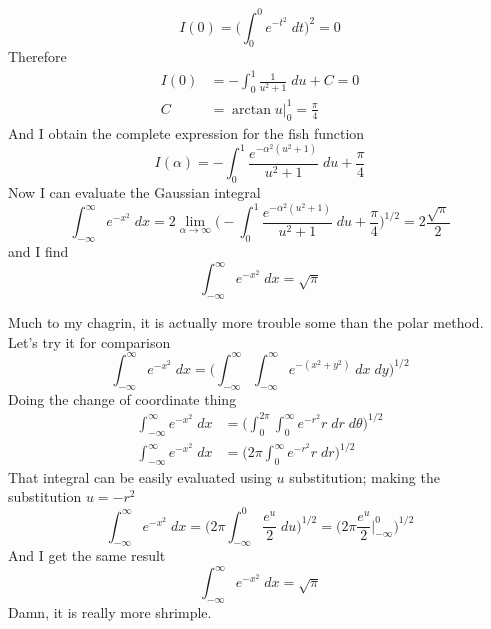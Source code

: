 \documentclass[../../main.tex]{subfiles}
\begin{document}
\begin{equation*}
    I(0)=\biggl(\int_{0}^{0}e^{-t^2}\;dt\biggr)^2=0
\end{equation*}
Therefore
\begin{align*}
    I(0)&=-\int_{0}^{1}\frac{1}{u^2+1}\;du+C=0\\
    C&=\arctan u\bigg|_{0}^{1}=\frac{\pi}{4}
\end{align*}
And I obtain the complete expression for the fish function
\begin{equation*}
    I(\alpha)=-\int_{0}^{1}\frac{e^{-\alpha^2(u^2+1)}}{u^2+1}\;du+\frac{\pi}{4}
\end{equation*}
Now I can evaluate the Gaussian integral
\begin{equation*}
    \int_{-\infty}^{\infty}e^{-x^2}\;dx=2\lim_{\alpha\rightarrow\infty}\biggl(-\int_{0}^{1}\frac{e^{-\alpha^2(u^2+1)}}{u^2+1}\;du+\frac{\pi}{4}\biggr)^{1/2}=2\frac{\sqrt{\pi}}{2}
\end{equation*}
and I find 
\begin{equation*}
    \int_{-\infty}^{\infty}e^{-x^2}\;dx=\sqrt{\pi}
\end{equation*}

Much to my chagrin, it is actually more trouble some than the polar method. Let's try it for comparison
\begin{equation*}
    \int_{-\infty}^{\infty}e^{-x^2}\;dx=\biggl(\int_{-\infty}^{\infty}\int_{-\infty}^{\infty}e^{-(x^2+y^2)}\;dx\;dy\biggr)^{1/2}
\end{equation*}
Doing the change of coordinate thing
\begin{align*}
    \int_{-\infty}^{\infty}e^{-x^2}\;dx&=\biggl(\int_{0}^{2\pi}\int_{0}^{\infty}e^{-r^2}r\;dr\;d\theta \biggr)^{1/2}\\
    \int_{-\infty}^{\infty}e^{-x^2}\;dx& = \biggl(2\pi\int_{0}^{\infty}e^{-r^2}r\;dr \biggr)^{1/2}
\end{align*}
That integral can be easily evaluated using $u$ substitution; making the substitution $u=-r^2$
\begin{equation*}
    \int_{-\infty}^{\infty}e^{-x^2}\;dx = \biggl(2\pi\int_{-\infty}^{0}\frac{e^u}{2}\;du \biggr)^{1/2} =  \biggl(2\pi\frac{e^u}{2}\bigg|_{-\infty}^{0} \biggr)^{1/2}
\end{equation*}
And I get the same result 
\begin{equation*}
    \int_{-\infty}^{\infty}e^{-x^2}\;dx = \sqrt{\pi}
\end{equation*}
Damn, it is really more shrimple.
\end{document}
